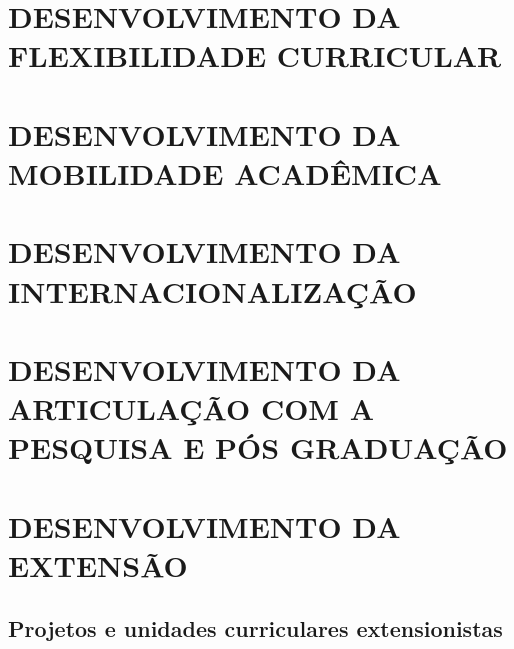 
\section{DESENVOLVIMENTO DA FLEXIBILIDADE CURRICULAR}

\section{DESENVOLVIMENTO DA MOBILIDADE ACADÊMICA}

\section{DESENVOLVIMENTO DA INTERNACIONALIZAÇÃO}

\section{DESENVOLVIMENTO DA ARTICULAÇÃO COM A PESQUISA E PÓS GRADUAÇÃO}

\section{DESENVOLVIMENTO DA EXTENSÃO}

\subsection{Projetos e unidades curriculares extensionistas}